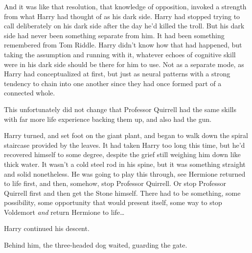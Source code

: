 And it was like that resolution, that knowledge of opposition, invoked a
strength from what Harry had thought of as his dark side. Harry had stopped
trying to call deliberately on his dark side after the day he'd killed the
troll. But his dark side had never been something separate from him. It had
been something remembered from Tom Riddle. Harry didn't know how that had
happened, but taking the assumption and running with it, whatever echoes of
cognitive skill were in his dark side should be there for him to use. Not as a
separate mode, as Harry had conceptualized at first, but just as neural
patterns with a strong tendency to chain into one another since they had once
formed part of a connected whole.

This unfortunately did not change that Professor Quirrell had the same skills
with far more life experience backing them up, and also had the gun.

Harry turned, and set foot on the giant plant, and began to walk down the
spiral staircase provided by the leaves. It had taken Harry too long this time,
but he'd recovered himself to some degree, despite the grief still weighing him
down like thick water. It wasn't a cold steel rod in his spine, but it was
something straight and solid nonetheless. He was going to play this through,
see Hermione returned to life first, and then, somehow, stop Professor
Quirrell. Or stop Professor Quirrell first and then get the Stone himself.
There had to be something, some possibility, some opportunity that would
present itself, some way to stop Voldemort \emph{and} return Hermione to
life{\ldots}

Harry continued his descent.

Behind him, the three-headed dog waited, guarding the gate.
